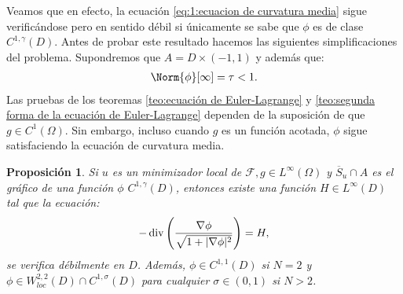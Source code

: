 \documentclass[a4paper,11pt,spanish, twoside, leqno]{tfm-uam}
\newtheorem{prop}[teo]{Proposición}
\begin{document}
Veamos que en efecto, la ecuación \ref{eq:1:ecuacion de curvatura media} sigue verificándose pero en sentido débil si únicamente se sabe que $\phi$ es de clase $C^{1,\gamma}(D)$. Antes de probar este resultado hacemos las siguientes simplificaciones del problema. Supondremos que $A=D\times (-1,1)$ y además que:
\begin{align*}
\Norm{\phi}[\infty]=\tau<1.
\end{align*}
Las pruebas de los teoremas \ref{teo:ecuación de Euler-Lagrange} y \ref{teo:segunda forma de la ecuación de Euler-Lagrange} dependen de la suposición de que $g\in C^{1}(\Omega)$. Sin embargo, incluso cuando $g$ es un función acotada, $\phi$ sigue satisfaciendo la ecuación de curvatura media.
\begin{prop}\label{prop:ecuacion de curvatura media para phi, g acotada}
Si $u$ es un minimizador local de $\mathcal{F},g\in L^{\infty}(\Omega)$ y $\overline{S}_{u}\cap A$ es el gráfico de una función $\phi$ $C^{1,\gamma}(D)$, entonces existe una función $H\in L^{\infty}(D)$ tal que la ecuación:
\begin{align}\label{prop:ecuacion de curvatura media para phi, g acotada:eq:1}
-\operatorname{div}\left( \dfrac{\nabla{\phi}}{\sqrt{1+\lvert\nabla{\phi}\rvert^{2}}}\right)=H,
\end{align}
se verifica débilmente en $D$. Además, $\phi\in C^{1,1}(D)$ si $N=2$ y $\phi\in W^{2,2}_{loc}(D)\cap C^{1,\sigma}(D)$ para cualquier $\sigma\in (0,1)$ si $N>2$. 
\end{prop}
\end{document}
